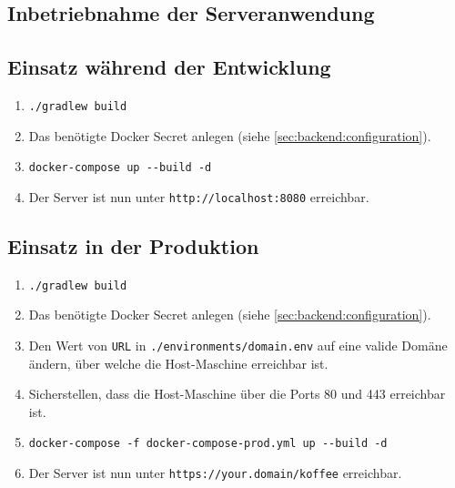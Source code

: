 \begin{appendix}
\appendixpage

\chapter{Inbetriebnahme der Serveranwendung}
\label{ch:appendix:instructions}

\section{Einsatz während der Entwicklung}
\label{sec:appendix:instructions:development}
\begin{enumerate}
	\item \verb|./gradlew build|
	\item Das benötigte Docker Secret anlegen (siehe \autoref{sec:backend:configuration}).
	\item \verb|docker-compose up --build -d|
	\item Der Server ist nun unter \verb|http://localhost:8080| erreichbar.
\end{enumerate}

\section{Einsatz in der Produktion}
\label{sec:appendix:instructions:production}
\begin{enumerate}
	\item \verb|./gradlew build|
	\item Das benötigte Docker Secret anlegen (siehe \autoref{sec:backend:configuration}).
	\item Den Wert von \verb|URL| in \verb|./environments/domain.env| auf eine valide Domäne ändern, über welche die Host-Maschine erreichbar ist.
	\item Sicherstellen, dass die Host-Maschine über die Ports 80 und 443 erreichbar ist.
	\item \verb|docker-compose -f docker-compose-prod.yml up --build -d|
	\item Der Server ist nun unter \verb|https://your.domain/koffee| erreichbar.
\end{enumerate}


\end{appendix}
